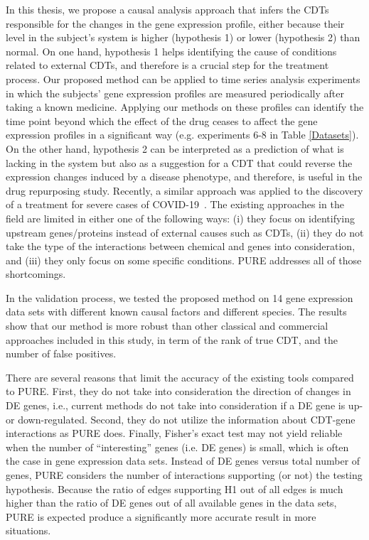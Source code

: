 \documentclass[Minh_PhD_thesis.tex]{subfiles}
\begin{document}
In this thesis, we propose a causal analysis approach that infers the CDTs responsible for the changes in the gene expression profile, either because their level in the subject's system is higher (hypothesis 1) or lower (hypothesis 2) than normal. 
On one hand,  hypothesis 1 helps identifying the cause of conditions related to external CDTs, and therefore is a crucial step for the treatment process. 
Our proposed method can be applied to time series analysis experiments in which the subjects' gene expression profiles are measured periodically after taking a known medicine. Applying our methods on these profiles can identify the time point beyond which the effect of the drug ceases to affect the gene expression profiles in a significant way  (e.g. experiments 6-8 in Table \ref{Datasets}).
On the other hand, hypothesis 2 can be interpreted as a prediction of what is lacking in the system but also as a suggestion for a CDT that could reverse the expression changes induced by a disease phenotype, and therefore, is useful in the drug repurposing study. Recently, a similar approach was applied to the discovery of a treatment for severe cases of COVID-19~\cite{DraghiciCOVID:2021}. 
The existing approaches in the field are limited in either one of the following ways: 
(i) they focus  on identifying upstream genes/proteins instead of external causes such as CDTs, (ii) they do not take the type of the interactions between chemical and genes into consideration, and (iii) they only focus on some specific conditions. PURE addresses all of those shortcomings.



In the validation process, we tested the proposed method on 14 gene expression data sets with different known causal factors and different species. The results show that our method is more robust than other classical and commercial approaches included in this study, in term of the rank of true CDT, and the number of false positives.

There are several reasons that limit the accuracy of the existing tools compared to PURE. First, they do not take into consideration the direction of changes in DE genes, i.e., current methods do not take into consideration if a DE gene is up- or down-regulated. Second, they do not utilize the information about CDT-gene interactions as PURE does. Finally, Fisher's exact test may not yield reliable when the number of ``interesting'' genes (i.e. DE genes) is small, which is often the case in gene expression data sets. Instead of DE genes versus total number of  genes, PURE considers the number of interactions supporting (or not)  the testing hypothesis. Because the ratio of edges supporting H1 out of all edges is much higher than the ratio of DE genes out of all available genes in the data sets, PURE is expected produce a significantly more accurate result in more situations.
\end{document}
